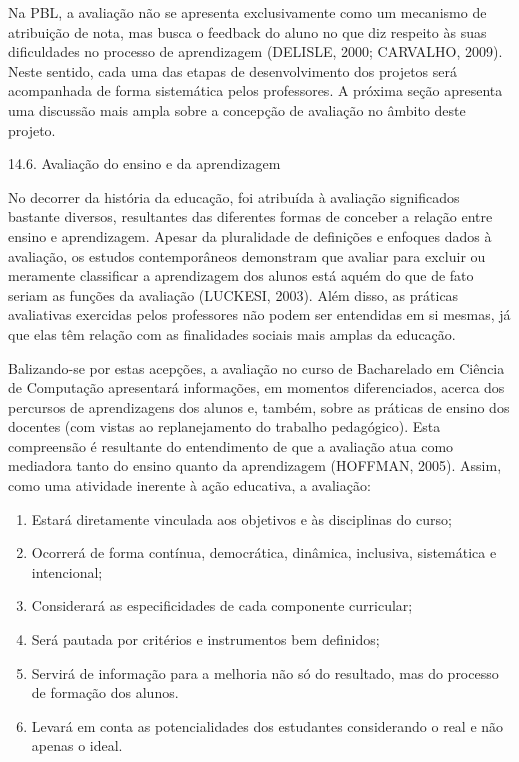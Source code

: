\documentclass[
	12pt,				%
	openright,			%
  oneside,     %
	a4paper,			%
	chapter=TITLE,		%
	english,			%
	french,				%
	spanish,			%
	brazil				%
	]{abntex2}
\begin{document}
Na PBL, a avaliação não se apresenta exclusivamente como um mecanismo de atribuição de nota, mas busca o feedback do aluno no que diz respeito às suas dificuldades no processo de aprendizagem (DELISLE, 2000; CARVALHO, 2009). Neste sentido, cada uma das etapas de desenvolvimento dos projetos será acompanhada de forma sistemática pelos professores.	
A próxima seção apresenta uma discussão mais ampla sobre a concepção de avaliação no âmbito deste projeto.

14.6. Avaliação do ensino e da aprendizagem

No decorrer da história da educação, foi atribuída à avaliação significados bastante diversos, resultantes das diferentes formas de conceber a relação entre ensino e aprendizagem. Apesar da pluralidade de definições e enfoques dados à avaliação, os estudos contemporâneos demonstram que avaliar para excluir ou meramente classificar a aprendizagem dos alunos está aquém do que de fato seriam as funções da avaliação (LUCKESI, 2003). Além disso, as práticas avaliativas exercidas pelos professores não podem ser entendidas em si mesmas, já que elas têm relação com as finalidades sociais mais amplas da educação.
	
Balizando-se por estas acepções, a avaliação no curso de Bacharelado em Ciência de Computação apresentará informações, em momentos diferenciados, acerca dos percursos de aprendizagens dos alunos e, também, sobre as práticas de ensino dos docentes (com vistas ao replanejamento do trabalho pedagógico). Esta compreensão é resultante do entendimento de que a avaliação atua como mediadora tanto do ensino quanto da aprendizagem (HOFFMAN, 2005). Assim, como uma atividade inerente à ação educativa, a avaliação:

\begin{enumerate}[label=(\alph*)]
    \item Estará	diretamente vinculada aos objetivos e às disciplinas do curso; 
    \item Ocorrerá de forma contínua, democrática, dinâmica, inclusiva, sistemática e intencional;
    \item Considerará as especificidades de cada componente curricular;
    \item Será pautada por critérios e instrumentos bem definidos;
    \item Servirá de informação para a melhoria não só do resultado, mas do processo de formação dos alunos.
    \item Levará	em conta as potencialidades dos estudantes considerando o real e não apenas o ideal.
\end{enumerate}
\end{document}
